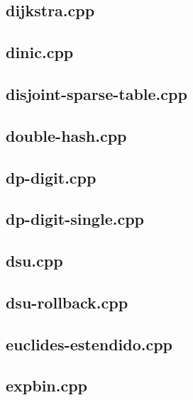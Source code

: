 \documentclass[a4paper,12pt]{article}
\begin{document}
\subsection{dijkstra.cpp}


\subsection{dinic.cpp}


\subsection{disjoint-sparse-table.cpp}


\subsection{double-hash.cpp}


\subsection{dp-digit.cpp}


\subsection{dp-digit-single.cpp}


\subsection{dsu.cpp}


\subsection{dsu-rollback.cpp}


\subsection{euclides-estendido.cpp}


\subsection{expbin.cpp}

\end{document}
